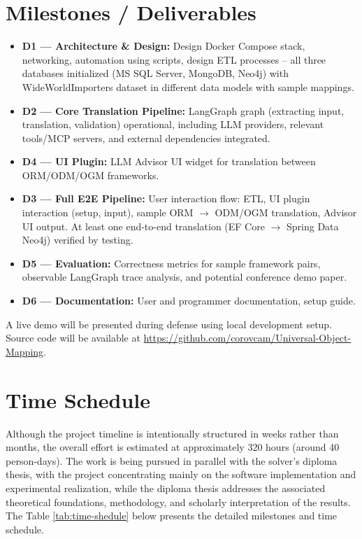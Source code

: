 \documentclass{article}
\begin{document}
\section{Milestones / Deliverables}

\begin{itemize}
  \item \textbf{D1 --- Architecture \& Design:} Design Docker Compose stack, networking, automation using scripts, design ETL processes -- all three databases initialized (MS SQL Server, MongoDB, Neo4j) with WideWorldImporters dataset in different data models with sample mappings.
  \item \textbf{D2 --- Core Translation Pipeline:} LangGraph graph (extracting input, translation, validation) operational, including LLM providers, relevant tools/MCP servers, and external dependencies integrated.
  \item \textbf{D4 --- UI Plugin:} LLM Advisor UI widget for translation between ORM/ODM/OGM frameworks.
  \item \textbf{D3 --- Full E2E Pipeline:} User interaction flow: ETL, UI plugin interaction (setup, input), sample ORM $\rightarrow$ ODM/OGM translation, Advisor UI output. At least one end-to-end translation (EF Core $\to$ Spring Data Neo4j) verified by testing.
  \item \textbf{D5 --- Evaluation:} Correctness metrics for sample framework pairs, observable LangGraph trace analysis, and potential conference demo paper.
  \item \textbf{D6 --- Documentation:} User and programmer documentation, setup guide.
\end{itemize}

A live demo will be presented during defense using local development setup. Source code will be available at \url{https://github.com/corovcam/Universal-Object-Mapping}.

\section{Time Schedule}

Although the project timeline is intentionally structured in weeks rather than months, the overall effort is estimated at approximately 320 hours (around 40 person-days). The work is being pursued in parallel with the solver’s diploma thesis, with the project concentrating mainly on the software implementation and experimental realization, while the diploma thesis addresses the associated theoretical foundations, methodology, and scholarly interpretation of the results. The Table \ref{tab:time-shedule} below presents the detailed milestones and time schedule.
\end{document}
